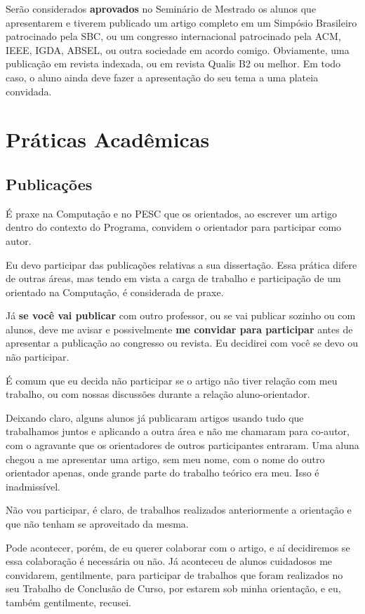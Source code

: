 \documentclass[a4paper,12pt]{report}
\begin{document}
Serão considerados \textbf{aprovados} no Seminário de Mestrado os alunos que apresentarem e tiverem publicado um artigo completo em um Simpósio Brasileiro patrocinado pela SBC, ou um congresso internacional patrocinado pela ACM, IEEE, IGDA, ABSEL, ou outra sociedade em acordo comigo. Obviamente, uma publicação em revista indexada, ou em revista Qualis B2 ou melhor. Em todo caso, o aluno ainda deve fazer a apresentação do seu tema a uma plateia convidada.

\chapter{Práticas Acadêmicas}

\section{Publicações}

É praxe na Computação e no PESC que os orientados, ao escrever um artigo dentro do contexto do Programa, convidem o orientador para participar como autor.

Eu devo participar das publicações relativas a sua dissertação. Essa prática difere de outras áreas, mas tendo em vista a carga de trabalho e participação de um orientado na Computação, é considerada de praxe.

Já \textbf{se você vai publicar} com outro professor, ou se vai publicar sozinho ou com alunos, deve me avisar e possivelmente \textbf{me convidar para participar} antes de apresentar a publicação ao congresso ou revista. Eu decidirei com você se devo ou não participar.

É comum que eu decida não participar se o artigo não tiver relação com meu trabalho, ou com nossas discussões durante a relação aluno-orientador.

Deixando claro, alguns alunos já publicaram artigos usando tudo que trabalhamos juntos e aplicando a outra área e não me chamaram para co-autor, com o agravante que os orientadores de outros participantes entraram. Uma aluna chegou a me apresentar uma artigo, sem meu nome, com o nome do outro orientador apenas, onde grande parte do trabalho teórico era meu. Isso é inadmissível.

Não vou participar, é claro, de trabalhos realizados anteriormente a orientação e que não tenham se aproveitado da mesma.

Pode acontecer, porém, de eu querer colaborar com o artigo, e aí decidiremos se essa colaboração é necessária ou não. Já aconteceu de alunos cuidadosos me convidarem, gentilmente, para participar de trabalhos que foram realizados no seu Trabalho de Conclusão de Curso, por estarem sob minha orientação, e eu, também gentilmente, recusei.
\end{document}
